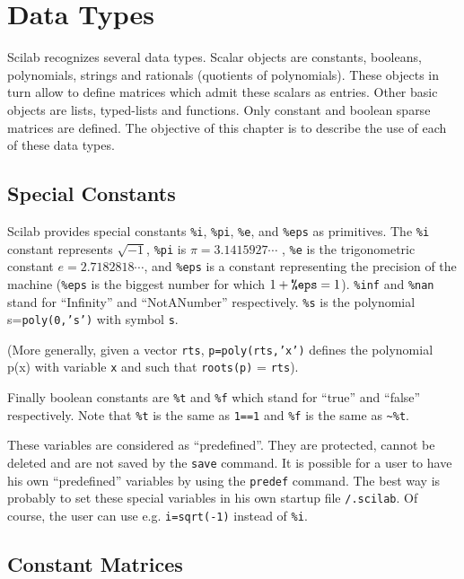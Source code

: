 
\chapter{Data Types}
\label{ch2}

Scilab recognizes several data types.
 Scalar objects are constants, booleans, polynomials, strings and 
rationals (quotients of polynomials). These objects in turn allow to 
define matrices which admit these scalars as entries.
Other basic objects are lists, typed-lists and functions. Only
constant and boolean sparse matrices are defined.
%
The objective of this chapter is to describe the use of each of 
these data types.

\section{Special Constants}
\label{s2.1}

	Scilab provides special constants {\tt \%i}, {\tt \%pi},
{\tt \%e}, and {\tt \%eps} as primitives.  The {\tt \%i} constant
represents $\sqrt{-1}$, {\tt \%pi} is $\pi=3.1415927\cdots$ , {\tt \%e}
is the trigonometric constant $e=2.7182818\cdots$, and {\tt \%eps}
is a constant representing the precision of the machine ({\tt \%eps}
is the biggest number for which $1+\mbox{\tt \%eps}=1$). {\tt \%inf}
and {\tt \%nan} stand for ``Infinity'' and ``NotANumber'' respectively.
{\tt \%s} is the polynomial s={\tt poly(0,'s')} with symbol {\tt s}.

(More generally, given a vector {\tt rts}, {\tt p=poly(rts,'x')}
defines the polynomial p(x) with variable {\tt x} and such 
that {\tt roots(p)} = {\tt rts}).

Finally boolean constants are {\tt \%t} and {\tt \%f} which stand for
``true'' and ``false'' respectively. Note that {\tt \%t} is the
same as {\tt 1==1} and {\tt \%f} is the same as {\verb!~%t!}.

These variables are considered as ``predefined''. They are protected, cannot 
be deleted and are not saved by the {\tt save} command. It is possible
for a user to have his own ``predefined'' variables by using the
{\tt predef} command. The best way is probably to set these special variables
in his own startup file {\tt <home dir>/.scilab}.
Of course, the user can use e.g. {\tt i=sqrt(-1)} instead of {\tt \%i}.

\section{Constant Matrices}
\label{s2.2}

